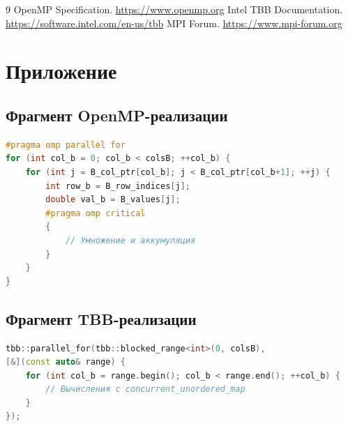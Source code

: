 \documentclass[a4paper,12pt]{article}
\begin{document}
\begin{thebibliography}{9}
 OpenMP Specification. \url{https://www.openmp.org}
 Intel TBB Documentation. \url{https://software.intel.com/en-us/tbb}
 MPI Forum. \url{https://www.mpi-forum.org}
\end{thebibliography}

\section{Приложение}
\subsection{Фрагмент OpenMP-реализации}
\begin{lstlisting}[language=C++]
#pragma omp parallel for
for (int col_b = 0; col_b < colsB; ++col_b) {
    for (int j = B_col_ptr[col_b]; j < B_col_ptr[col_b+1]; ++j) {
        int row_b = B_row_indices[j];
        double val_b = B_values[j];
        #pragma omp critical
        {
            // Умножение и аккумуляция
        }
    }
}
\end{lstlisting}

\subsection{Фрагмент TBB-реализации}
\begin{lstlisting}[language=C++]
tbb::parallel_for(tbb::blocked_range<int>(0, colsB), 
[&](const auto& range) {
    for (int col_b = range.begin(); col_b < range.end(); ++col_b) {
        // Вычисления с concurrent_unordered_map
    }
});
\end{lstlisting}
\end{document}

